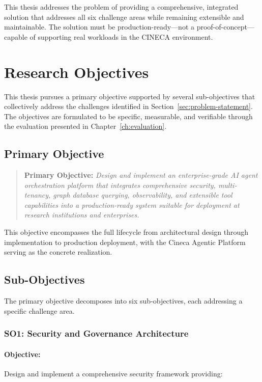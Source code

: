 \documentclass[a4paper,twoside]{sapthesis}
\begin{document}
This thesis addresses the problem of providing a comprehensive, integrated solution that addresses all six challenge areas while remaining extensible and maintainable. The solution must be production-ready---not a proof-of-concept---capable of supporting real workloads in the CINECA environment.

\section{Research Objectives}
\label{sec:objectives}

This thesis pursues a primary objective supported by several sub-objectives that collectively address the challenges identified in Section~\ref{sec:problem-statement}. The objectives are formulated to be specific, measurable, and verifiable through the evaluation presented in Chapter~\ref{ch:evaluation}.

\subsection{Primary Objective}

\begin{quote}
\textbf{Primary Objective:} \emph{Design and implement an enterprise-grade AI agent orchestration platform that integrates comprehensive security, multi-tenancy, graph database querying, observability, and extensible tool capabilities into a production-ready system suitable for deployment at research institutions and enterprises.}
\end{quote}

This objective encompasses the full lifecycle from architectural design through implementation to production deployment, with the Cineca Agentic Platform serving as the concrete realization.

\subsection{Sub-Objectives}

The primary objective decomposes into six sub-objectives, each addressing a specific challenge area.

\subsubsection{SO1: Security and Governance Architecture}

\paragraph{Objective:} Design and implement a comprehensive security framework providing:
\end{document}
